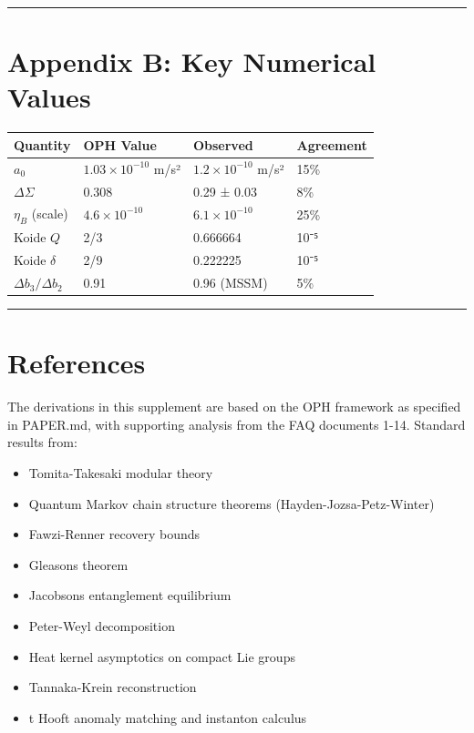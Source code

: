 \begin{center}\rule{0.5\linewidth}{0.5pt}\end{center}

\section{Appendix B: Key Numerical Values}\label{appendix-b-key-numerical-values}

{\def\LTcaptype{none} %
\begin{longtable}[]{@{}llll@{}}
\toprule\noalign{}
Quantity & OPH Value & Observed & Agreement \\
\midrule\noalign{}
\endhead
\bottomrule\noalign{}
\endlastfoot
\(a_0\) & \(1.03 \times 10^{-10}\) m/s² & \(1.2 \times 10^{-10}\) m/s² & 15\% \\
\(\Delta\Sigma\) & 0.308 & 0.29 ± 0.03 & 8\% \\
\(\eta_B\) (scale) & \(4.6 \times 10^{-10}\) & \(6.1 \times 10^{-10}\) & 25\% \\
Koide \(Q\) & 2/3 & 0.666664 & 10⁻⁵ \\
Koide \(\delta\) & 2/9 & 0.222225 & 10⁻⁵ \\
\(\Delta b_3/\Delta b_2\) & 0.91 & 0.96 (MSSM) & 5\% \\
\end{longtable}
}

\begin{center}\rule{0.5\linewidth}{0.5pt}\end{center}

\section{References}\label{references}

The derivations in this supplement are based on the OPH framework as specified in PAPER.md, with supporting analysis from the FAQ documents 1-14. Standard results from:

\begin{itemize}
\tightlist
\item
  Tomita-Takesaki modular theory
\item
  Quantum Markov chain structure theorems (Hayden-Jozsa-Petz-Winter)
\item
  Fawzi-Renner recovery bounds
\item
  Gleason\textquotesingle s theorem
\item
  Jacobson\textquotesingle s entanglement equilibrium
\item
  Peter-Weyl decomposition
\item
  Heat kernel asymptotics on compact Lie groups
\item
  Tannaka-Krein reconstruction
\item
  \textquotesingle t Hooft anomaly matching and instanton calculus
\end{itemize}
